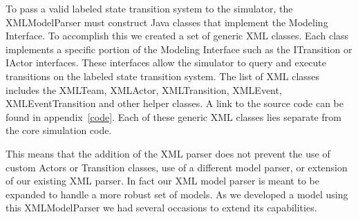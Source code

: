 To pass a valid labeled state transition system to the simulator, the XMLModelParser must construct Java classes that implement the Modeling Interface.  To accomplish this we created a set of generic XML classes.  Each class implements a specific portion of the Modeling Interface such as the ITransition or IActor interfaces.  These interfaces allow the simulator to query and execute transitions on the labeled state transition system.  The list of XML classes includes the XMLTeam, XMLActor, XMLTransition, XMLEvent, XMLEventTransition and other helper classes.  A link to the source code can be found in appendix~\ref{code}.  Each of these generic XML classes lies separate from the core simulation code.  

This means that the addition of the XML parser does not prevent the use of custom Actors or Transition classes, use of a different model parser, or extension of our existing XML parser.  In fact our XML model parser is meant to be expanded to handle a more robust set of models.   As we developed a model using this XMLModelParser we had several occasions to extend its capabilities.

